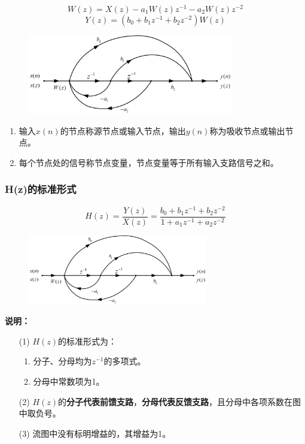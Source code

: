 \documentclass[notheorems,compress,mathserif,table]{beamer}
\begin{document}
\begin{frame}\frametitle{}%
$$W(z)=X(z)-a_1W(z)z^{-1}-a_2W(z)z^{-2}$$
$$Y(z)=(b_0+b_1z^{-1}+b_2z^{-2})W(z)$$
\begin{figure}[h]
  \centering
  \includegraphics[width=0.8\textwidth]{jbxinhaoliutu.jpg}
  \label{graph:ch5exam1}
\end{figure}
\begin{enumerate}
  \item 输入$x(n)$的节点称源节点或输入节点，输出$y(n)$称为吸收节点或输出节点。
  \item 每个节点处的信号称节点变量，{\heiti 节点变量等于所有输入支路信号之和}。
\end{enumerate}
\end{frame}
\begin{frame}[shrink]\frametitle{H(z)的标准形式}%

$$ H(z)=\frac{Y(z)}{X(z)}= \frac{b_0+b_1z^{-1}+b_2z^{-2}}{1+a_1z^{-1}+a_2z^{-2}}$$
\begin{figure}[h]
  \centering
  \includegraphics[width=0.7\textwidth]{jbxinhaoliutu.jpg}
  \label{graph:ch5exam1}
\end{figure}
\textbf{说明：}
\begin{enumerate}
  \item [(1)] $H(z)$的标准形式为：
  \begin{enumerate}
    \item 分子、分母均为$z^{-1}$的多项式。
    \item 分母中常数项为1。
  \end{enumerate}
  \item [(2)] $H(z)$的\textbf{分子代表前馈支路}，\textbf{分母代表反馈支路}，且分母中各项系数在图中取负号。
  \item [(3)] 流图中没有标明增益的，其增益为1。
\end{enumerate}
\end{frame}
\end{document}
